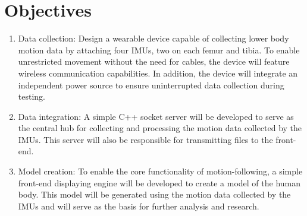 

\section{Objectives}
\begin{enumerate}
    \item Data collection:
    Design a wearable device capable of collecting lower body motion data by attaching four IMUs, two on each femur and tibia.
    To enable unrestricted movement without the need for cables, the device will feature wireless communication capabilities.
    In addition, the device will integrate an independent power source to ensure uninterrupted data collection during testing.

    \item Data integration:
    A simple C++ socket server will be developed to serve as the central hub for collecting and processing the motion data collected by the IMUs.
    This server will also be responsible for transmitting files to the front-end.

    \item Model creation:
    To enable the core functionality of motion-following, a simple front-end displaying engine will be developed to create a model of the human body.
    This model will be generated using the motion data collected by the IMUs and will serve as the basis for further analysis and research.
\end{enumerate}


